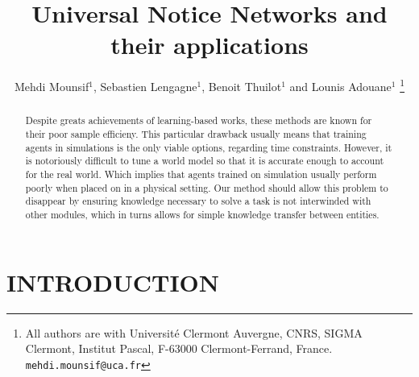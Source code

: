 \documentclass[letterpaper, 10 pt, conference]{ieeeconf}  %
\title{\LARGE \bf
Universal Notice Networks and their applications 
}
\author{Mehdi Mounsif$^{1}$, Sebastien Lengagne$^{1}$, Benoit Thuilot$^{1}$ and Lounis Adouane$^{1}$%
\thanks{All authors are with Université Clermont Auvergne, CNRS, SIGMA Clermont, Institut Pascal, F-63000 Clermont-Ferrand, France.
        {\tt\small mehdi.mounsif@uca.fr}}%
}
\begin{document}
\maketitle
\thispagestyle{empty}
\pagestyle{empty}


\begin{abstract}

Despite greats achievements of learning-based works, these methods are known for their poor sample efficieny. This particular drawback usually means that training agents in simulations is the only viable options, regarding time constraints. However, it is notoriously difficult to tune a world model so that it is accurate enough to account for the real world. Which implies that agents trained on simulation usually perform poorly when placed on in a physical setting. Our method should allow this problem to disappear by ensuring knowledge necessary to solve a task is not interwinded with other modules, which in turns allows for simple knowledge transfer between entities. 

\end{abstract}


\section{INTRODUCTION}
\end{document}
